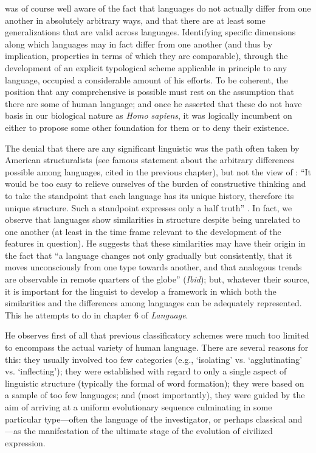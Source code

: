 {\Sapir} was of course well aware of the fact that languages do not
actually differ from one another in absolutely arbitrary ways, and
that there are at least some generalizations that are valid across
languages. Identifying specific dimensions along which languages may
in fact differ from one another (and thus by implication, properties
in terms of which they are comparable), through the development of an
explicit typological scheme applicable in principle to any language,
occupied a considerable amount of his efforts. To be coherent, the
position that any comprehensive  is possible must rest on the
assumption that there are some  of human language; and once
he asserted that these do not have basis in our biological nature as
\emph{Homo sapiens}, it was logically incumbent on {\Sapir} either to
propose some other foundation for them or to deny their existence.

The denial that there are any significant linguistic  was
the path often taken by American structuralists (see
 famous statement about the arbitrary
differences possible among languages, cited in the previous chapter),
but not the view of {\Sapir}: ``It would be too easy to relieve ourselves of the
burden of constructive thinking and to take the standpoint that each
language has its unique history, therefore its unique structure. Such
a standpoint expresses only a half truth''
\citep[121]{sapir21:language}. In fact, we observe that languages show
similarities in structure despite being unrelated to one another (at
least in the time frame relevant to the development of the features in
question). He suggests that these similarities may have their origin
in the fact that ``a language changes not only gradually but
consistently, that it moves unconsciously from one type towards
another, and that analogous trends are observable in remote quarters
of the globe'' (\emph{Ibid}); but, whatever their source, it is
important for the linguist to develop a framework in which both the
similarities and the differences among languages can be adequately
represented. This he attempts to do in chapter 6 of \textsl{Language}.

He observes first of all that previous classificatory schemes were
much too limited to encompass the actual variety of human
language. There are several reasons for this: they usually involved
too few categories (e.g., `isolating' vs. `agglutinating'
vs. `inflecting'); they were established with regard to only a single
aspect of linguistic structure (typically the formal  of word
formation); they were based on a sample of too few languages; and
(most importantly), they were guided by the aim of arriving at a
uniform evolutionary sequence culminating in some particular
type—often the language of the investigator, or perhaps classical
 and —as the manifestation of the ultimate stage of the
evolution of civilized expression.


